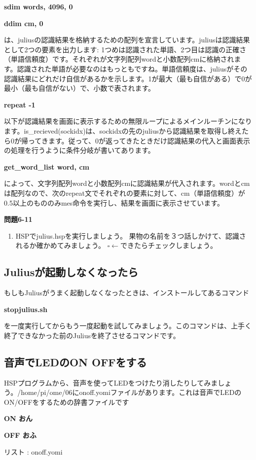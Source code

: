 \documentclass[a4paper,dvipdfmx]{jarticle}
\newcommand\liststyleLxiv{%
\renewcommand\theenumi{\arabic{enumi}}
\renewcommand\theenumii{\arabic{enumii}}
\renewcommand\theenumiii{\arabic{enumiii}}
\renewcommand\theenumiv{\arabic{enumiv}}
\renewcommand\labelenumi{\theenumi.}
\renewcommand\labelenumii{\theenumii.}
\renewcommand\labelenumiii{\theenumiii.}
\renewcommand\labelenumiv{\theenumiv.}
}
\newcounter{List}
\renewcommand\theList{\arabic{List}}
\begin{document}
{\ttfamily\bfseries
sdim words, 4096, 0}

{\ttfamily\bfseries
ddim cm, 0}

{
は、juliusの認識結果を格納するための配列を宣言しています。juliusは認識結果として2つの要素を出力します:
1つめは認識された単語、2つ目は認識の正確さ（単語信頼度）です。それぞれが文字列配列wordと小数配列cmに格納されます。認識された単語が必要なのはもっともですね。単語信頼度は、juliusがその認識結果にどれだけ自信があるかを示します。1が最大（最も自信がある）で0が最小（最も自信がない）で、小数で表されます。}

{\ttfamily\bfseries
repeat -1}

{
以下が認識結果を画面に表示するための無限ループによるメインルーチンになります。is\_recieved(sockidx)は、sockidxの先のjuliusから認識結果を取得し終えたら0が帰ってきます。従って、0が返ってきたときだけ認識結果の代入と画面表示の処理を行うように条件分岐が書いてあります。}

{\ttfamily\bfseries
get\_word\_list word, cm}

{
によって、文字列配列wordと小数配列cmに認識結果が代入されます。wordとcmは配列なので、次のrepeat文でそれぞれの要素に対して、cm（単語信頼度）が0.5以上のもののみmes命令を実行し、結果を画面に表示させています。}

{\bfseries
問題6-11}

\liststyleLxiv
\begin{enumerate}
\item {
HSPでjulius.hspを実行しましょう。\newline
果物の名前を３つ話しかけて、認識されるか確かめてみましょう。\newline
${\square}\leftarrow
できたらチェックしましょう。$}
\end{enumerate}
\subsection{Juliusが起動しなくなったら}
{
もしもJuliusがうまく起動しなくなったときは、インストールしてあるコマンド}

{\ttfamily\bfseries
stopjulius.sh}


\bigskip

{
を一度実行してからもう一度起動を試してみましょう。このコマンドは、上手く終了できなかった前のJuliusを終了させるコマンドです。}

\subsection{音声でLEDのON OFFをする}
{
HSPプログラムから、音声を使ってLEDをつけたり消したりしてみましょう。/home/pi/ome/06にonoff.yomiファイルがあります。これは音声でLEDのON/OFFをするための辞書ファイルです\newline
\begin{minipage}{17.006cm}
{\ttfamily\bfseries
ON おん}

{\ttfamily\bfseries
OFF おふ}

{\upshape
リスト {\theList\label{seq:refList6}}: onoff.yomi}
\end{minipage}}
\end{document}
